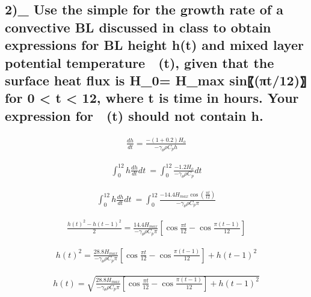 \documentclass[11pt]{article}
\begin{document}
    \hypertarget{use-the-simple-for-the-growth-rate-of-a-convective-bl-discussed-in-class-to-obtain-expressions-for-bl-height-ht-and-mixed-layer-potential-temperature-t-given-that-the-surface-heat-flux-is-h_0-h_max-sinux3c0t12-for-0-t-12-where-t-is-time-in-hours.-your-expression-for-t-should-not-contain-h.}{%
\subsection{2)\_ Use the simple for the growth rate of a convective BL
discussed in class to obtain expressions for BL height h(t) and mixed
layer potential temperature  (t), given that the surface heat flux is
H\_0= H\_max sin⁡〖(πt/12)〗 for 0 \textless{} t \textless{} 12, where t
is time in hours. Your expression for  (t) should not contain
h.}\label{use-the-simple-for-the-growth-rate-of-a-convective-bl-discussed-in-class-to-obtain-expressions-for-bl-height-ht-and-mixed-layer-potential-temperature-t-given-that-the-surface-heat-flux-is-h_0-h_max-sinux3c0t12-for-0-t-12-where-t-is-time-in-hours.-your-expression-for-t-should-not-contain-h.}}

    \begin{align}
\frac{dh}{dt} = \frac{-(1 + 0.2) H_{o}}{-\gamma_{\theta} \rho C_{p} h}
\end{align}

    \begin{align}
\int_0^{12} h\frac{dh}{dt}dt\ = \int_0^{12} \frac{-1.2H_o}{-\gamma_\theta\rho C_p}dt
\end{align}

    \begin{align}
\int_0^{12} h\frac{dh}{dt}dt\ = \int_0^{12} \frac{-14.4H_{max}\cos(\frac{\pi t}{12})}{-\gamma_\theta \rho C_p \pi}
\end{align}

    \begin{align}
\frac{h(t)^2 - h(t-1)^2}{2} = \frac{14.4 H_{max}}{-\gamma_\theta \rho C_{p} \pi} [\cos \frac{\pi t}{12} - \cos \frac{\pi (t-1)}{12}]
\end{align}

    \begin{align}
h(t)^2 = \frac{28.8 H_{max}}{-\gamma_\theta \rho C_{p} \pi} [\cos \frac{\pi t}{12} - \cos \frac{\pi (t-1)}{12}] + h(t-1)^2
\end{align}

    \begin{align}
h(t) = \sqrt{\frac{28.8 H_{max}}{-\gamma_\theta \rho C_{p} \pi} [\cos \frac{\pi t}{12} - \cos \frac{\pi (t-1)}{12}] + h(t-1)^2}
\end{align}
\end{document}
